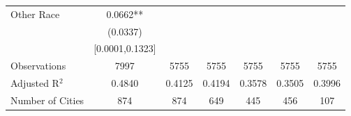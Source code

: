 \documentclass{article}
\begin{document}
\begin{table}[htbp]
\begin{tabular}{l*{6}{c}}
Other Race          &      0.0662** &               &               &               &               &               \\
                    &    (0.0337)   &               &               &               &               &               \\
                    &[0.0001,0.1323]   &               &               &               &               &               \\
\midrule
Observations        &        7997   &        5755   &        5755   &        5755   &        5755   &        5755   \\
Adjusted R$^2$      &      0.4840   &      0.4125   &      0.4194   &      0.3578   &      0.3505   &      0.3996   \\
Number of Cities    &         874   &         874   &         649   &         445   &         456   &         107   \\
\bottomrule
\end{tabular}
\end{table}
\end{document}
